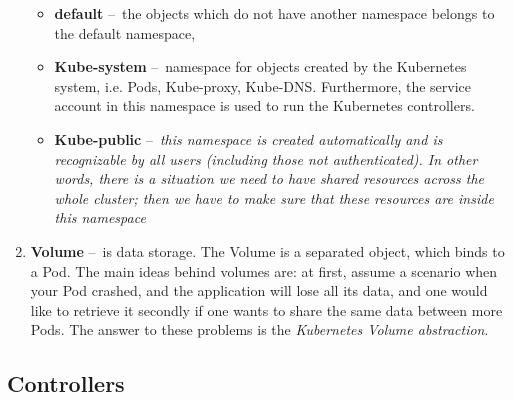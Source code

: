 \begin{enumerate}[itemsep=1mm, parsep=0pt]
    \begin{itemize}
        \item \textbf{default} \---\ the objects which do not have another namespace belongs to the default namespace,
        \item \textbf{Kube-system} \---\ namespace for objects created by the Kubernetes system, i.e. Pods, Kube-proxy, Kube-DNS. Furthermore, the service account in this namespace is used to run the Kubernetes controllers.
        \item \textbf{Kube-public} \---\ \textit{this namespace is created automatically and is recognizable by all users (including those not authenticated). In other words, there is a situation we need to have shared resources across the whole cluster; then we have to make sure that these resources are inside this namespace} \cite{namespaceTypes}
    \end{itemize}

    \item \textbf{Volume} \---\ is data storage.
    The Volume is a separated object, which binds to a Pod.
    The main ideas behind volumes are: at first, assume a scenario when your Pod crashed, and the application will lose all its data, and one would like to retrieve it secondly if one wants to share the same data between more Pods.
    The answer to these problems is the \emph{Kubernetes Volume abstraction}.
\end{enumerate}

\subsection{Controllers}

